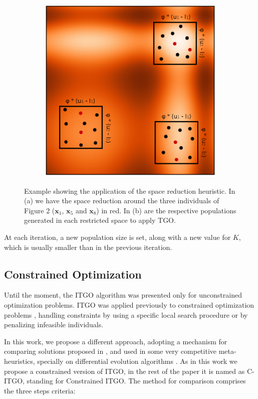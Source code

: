 \begin{figure}[tp]
\begin{subfigure}{.5\textwidth}
  \includegraphics[width=1.1\linewidth]{fig_3.eps}
  \caption{}
  \label{fig:SpaceReduction-b}
\end{subfigure}
\caption{Example showing the application of the space reduction heuristic. In (a) we have the space reduction around the three individuals of Figure 2 ($\bm{x}_1$, $\bm{x}_5$ and $\bm{x}_8$) in red. In (b) are the respective populations generated in each restricted space to apply TGO.}\label{fig:SpaceReduction}
\end{figure}


At each iteration, a new population size is set, along with a new value for $K$, which is usually smaller than in the previous iteration.


\subsection{Constrained Optimization}

Until the moment, the ITGO algorithm was presented only for unconstrained optimization problems. ITGO was applied previously to constrained optimization problems \citep{ITGO2, ITGO3}, handling constraints by using a specific local search procedure or by penalizing infeasible individuals.

In this work, we propose a different approach, adopting a mechanism for comparing solutions proposed in \cite{ConHandling}, and used in some very competitive meta-heuristics, specially on differential evolution algorithms \citep{DE1, DE2, DE3}. As in this work we propose a constrained version of ITGO, in the rest of the paper it is named as C-ITGO, standing for Constrained ITGO. The method for comparison comprises the three steps criteria:


